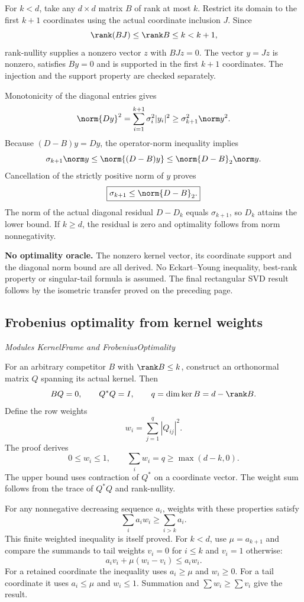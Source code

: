 For $k<d$, take any $d\times d$ matrix $B$ of rank at most $k$. Restrict its domain to the first $k+1$ coordinates using the actual coordinate inclusion $J$. Since
\[
\rank(BJ)\leq\rank B\leq k<k+1,
\]
rank-nullity supplies a nonzero vector $z$ with $BJz=0$. The vector $y=Jz$ is nonzero, satisfies $By=0$ and is supported in the first $k+1$ coordinates. The injection and the support property are checked separately.

Monotonicity of the diagonal entries gives
\[
\norm{Dy}^{2}
=\sum_{i=1}^{k+1}\sigma_i^{2}|y_i|^{2}
\geq\sigma_{k+1}^{2}\norm y^{2}.
\]
Because $(D-B)y=Dy$, the operator-norm inequality implies
\[
\sigma_{k+1}\norm y
\leq\norm{(D-B)y}
\leq\norm{D-B}_2\norm y.
\]
Cancellation of the strictly positive norm of $y$ proves
\[
\boxed{\sigma_{k+1}\leq\norm{D-B}_2.}
\]
The norm of the actual diagonal residual $D-D_k$ equals $\sigma_{k+1}$, so $D_k$ attains the lower bound. If $k\geq d$, the residual is zero and optimality follows from norm nonnegativity.

\textbf{No optimality oracle.} The nonzero kernel vector, its coordinate support and the diagonal norm bound are all derived. No Eckart--Young inequality, best-rank property or singular-tail formula is assumed. The final rectangular SVD result follows by the isometric transfer proved on the preceding page.



\subsection{Frobenius optimality from kernel weights}\label{supp6:subsection:004}\textit{Modules KernelFrame and FrobeniusOptimality}\par
For an arbitrary competitor $B$ with $\rank B\leq k$, construct an orthonormal matrix $Q$ spanning its actual kernel. Then
\[
BQ=0,\qquad Q^*Q=I,\qquad q=\dim\ker B=d-\rank B.
\]
Define the row weights
\[
w_i=\sum_{j=1}^{q}|Q_{ij}|^2.
\]
The proof derives
\[
\boxed{0\leq w_i\leq1,\qquad \sum_iw_i=q\geq\max(d-k,0).}
\]
The upper bound uses contraction of $Q^*$ on a coordinate vector. The weight sum follows from the trace of $Q^*Q$ and rank-nullity.

For any nonnegative decreasing sequence $a_i$, weights with these properties satisfy
\[
\sum_i a_iw_i\geq\sum_{i>k}a_i.
\]
This finite weighted inequality is itself proved. For $k<d$, use $\mu=a_{k+1}$ and compare the summands to tail weights $v_i=0$ for $i\leq k$ and $v_i=1$ otherwise:
\[
a_iv_i+\mu(w_i-v_i)\leq a_iw_i.
\]
For a retained coordinate the inequality uses $a_i\geq\mu$ and $w_i\geq0$. For a tail coordinate it uses $a_i\leq\mu$ and $w_i\leq1$. Summation and $\sum w_i\geq\sum v_i$ give the result.

